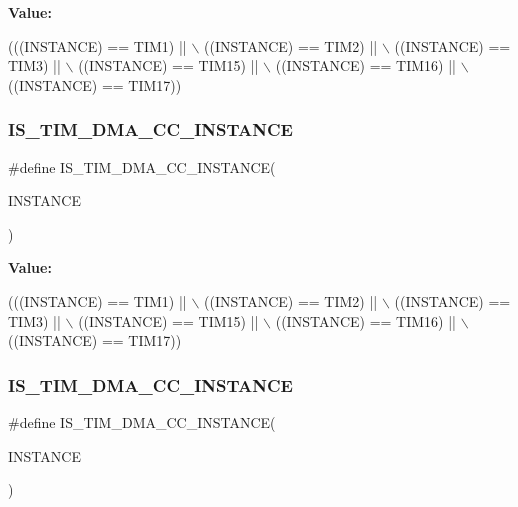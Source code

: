 {\bfseries Value\+:}
\begin{DoxyCode}
(((INSTANCE) == TIM1)    || \(\backslash\)
   ((INSTANCE) == TIM2)    || \(\backslash\)
   ((INSTANCE) == TIM3)    || \(\backslash\)
   ((INSTANCE) == TIM15)   || \(\backslash\)
   ((INSTANCE) == TIM16)   || \(\backslash\)
   ((INSTANCE) == TIM17))
\end{DoxyCode}
\mbox{\label{group___exported__macro_gad80a186286ce3daa92249a8d52111aaf}} 
\subsubsection{\texorpdfstring{I\+S\+\_\+\+T\+I\+M\+\_\+\+D\+M\+A\+\_\+\+C\+C\+\_\+\+I\+N\+S\+T\+A\+N\+CE}{IS\_TIM\_DMA\_CC\_INSTANCE}\hspace{0.1cm}{\footnotesize\ttfamily [14/16]}}
{\footnotesize\ttfamily \#define I\+S\+\_\+\+T\+I\+M\+\_\+\+D\+M\+A\+\_\+\+C\+C\+\_\+\+I\+N\+S\+T\+A\+N\+CE(\begin{DoxyParamCaption}\item[{}]{I\+N\+S\+T\+A\+N\+CE }\end{DoxyParamCaption})}

{\bfseries Value\+:}
\begin{DoxyCode}
(((INSTANCE) == TIM1)    || \(\backslash\)
   ((INSTANCE) == TIM2)    || \(\backslash\)
   ((INSTANCE) == TIM3)    || \(\backslash\)
   ((INSTANCE) == TIM15)   || \(\backslash\)
   ((INSTANCE) == TIM16)   || \(\backslash\)
   ((INSTANCE) == TIM17))
\end{DoxyCode}
\mbox{\label{group___exported__macro_gad80a186286ce3daa92249a8d52111aaf}} 
\subsubsection{\texorpdfstring{I\+S\+\_\+\+T\+I\+M\+\_\+\+D\+M\+A\+\_\+\+C\+C\+\_\+\+I\+N\+S\+T\+A\+N\+CE}{IS\_TIM\_DMA\_CC\_INSTANCE}\hspace{0.1cm}{\footnotesize\ttfamily [15/16]}}
{\footnotesize\ttfamily \#define I\+S\+\_\+\+T\+I\+M\+\_\+\+D\+M\+A\+\_\+\+C\+C\+\_\+\+I\+N\+S\+T\+A\+N\+CE(\begin{DoxyParamCaption}\item[{}]{I\+N\+S\+T\+A\+N\+CE }\end{DoxyParamCaption})}

